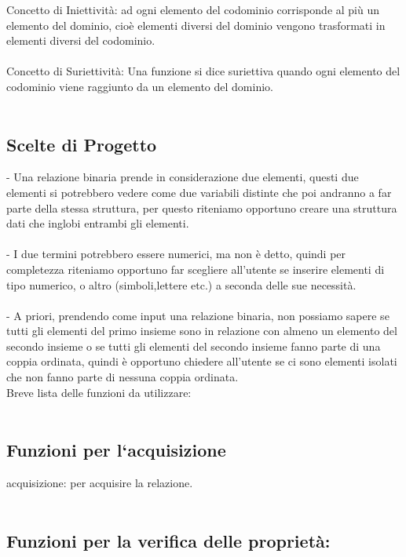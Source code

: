 \documentclass[11pt, a4paper, titlepage, block]{article}
\begin{document}
Concetto di Iniettivit\`a: ad ogni elemento del codominio corrisponde al pi\`u
un elemento del dominio, cio\`e elementi diversi del dominio
vengono trasformati in elementi diversi del codominio.\\
\\
Concetto di Suriettivit\`a: Una funzione si dice suriettiva quando ogni elemento del codominio viene raggiunto da un elemento del dominio.\\
\\
\newpage
\subsection{Scelte di Progetto}

- Una relazione binaria prende in considerazione due elementi, questi due elementi si potrebbero vedere come due variabili distinte che poi andranno a far parte della stessa struttura, per questo riteniamo opportuno creare una struttura dati che inglobi entrambi gli elementi.\\
\\
- I due termini potrebbero essere numerici, ma non \`e detto, quindi per completezza riteniamo opportuno far scegliere all'utente se inserire elementi di tipo numerico, o altro (simboli,lettere etc.) a seconda delle sue necessit\`a.\\
\\
- A priori, prendendo come input una relazione binaria, non possiamo sapere se tutti gli elementi del primo insieme sono in relazione con almeno un elemento del secondo insieme o se tutti gli elementi del secondo insieme fanno parte di una coppia ordinata, quindi \`e opportuno chiedere all'utente se ci sono elementi isolati che non fanno parte di nessuna coppia ordinata.\\ 
\newpage
Breve lista delle funzioni da utilizzare:\\
\\
	\subsection{Funzioni per l`acquisizione}
	
	acquisizione: per acquisire la relazione.\\
	\\
	
	\subsection{Funzioni per la verifica delle propriet\`a:}
\end{document}
